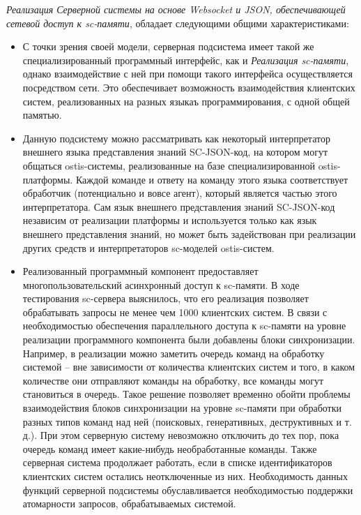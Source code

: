 \textit{Реализация Серверной системы на основе Websocket и JSON, обеспечивающей сетевой доступ к sc-памяти}, обладает следующими общими характеристиками:
\begin{itemize}
    \item С точки зрения своей модели, серверная подсистема имеет такой же специализированный программный интерфейс, как и \textit{Реализация sc-памяти}, однако взаимодействие с ней при помощи такого интерфейса осуществляется посредством сети. Это обеспечивает возможность взаимодействия клиентских систем, реализованных на разных языкаъ программирования, с одной общей памятью.
    \item Данную подсистему можно рассматривать как некоторый интерпретатор внешнего языка представления знаний SC-JSON-код, на котором могут общаться ostis-системы, реализованные на базе специализированной ostis-платформы. Каждой команде и ответу на команду этого языка соответствует обработчик (потенциально и вовсе агент), который является частью этого интерпретатора. Сам язык внешнего представления знаний SC-JSON-код независим от реализации платформы и используется только как язык внешнего представления знаний, но может быть задействован при реализации других средств и интерпретаторов sc-моделей ostis-систем.
    \item Реализованный программный компонент предоставляет многопользовательский асинхронный доступ к sc-памяти. В ходе тестирования sc-сервера выяснилось, что его реализация позволяет обрабатывать запросы не менее чем 1000 клиентских систем. В связи с необходимостью обеспечения параллельного доступа к sc-памяти на уровне реализации программного компонента были добавлены блоки синхронизации. Например, в реализации можно заметить очередь команд на обработку системой -- вне зависимости от количества клиентских систем и того, в каком количестве они отправляют команды на обработку, все команды могут становиться в очередь. Такое решение позволяет временно обойти проблемы взаимодействия блоков синхронизации на уровне sc-памяти при обработки разных типов команд над ней (поисковых, генеративных, деструктивных и т. д.). При этом серверную систему невозможно отключить до тех пор, пока очередь команд имеет какие-нибудь необработанные команды. Также серверная система продолжает работать, если в списке идентификаторов клиентских систем остались неотключенные из них. Необходимость данных функций серверной подсистемы обуславливается необходимостью поддержки атомарности запросов, обрабатываемых системой.

\end{itemize}
